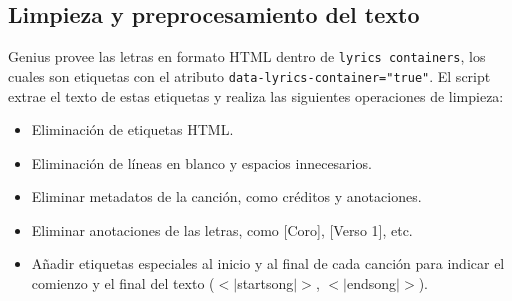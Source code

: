 \documentclass[paper=letter, fontsize=11pt, draft=false]{scrartcl}
\numberwithin{equation}{section} %
\numberwithin{figure}{section} %
\numberwithin{table}{section} %
\numberwithin{subsection}{section}
\begin{document}
\subsection{Limpieza y preprocesamiento del texto}

Genius provee las letras en formato HTML dentro de \texttt{lyrics containers}, los cuales son etiquetas con el atributo \texttt{data-lyrics-container="true"}. El script extrae el texto de estas etiquetas y realiza las siguientes operaciones de limpieza:

\begin{itemize}
    \item Eliminación de etiquetas HTML.
    \item Eliminación de líneas en blanco y espacios innecesarios.
    \item Eliminar metadatos de la canción, como créditos y anotaciones.
    \item Eliminar anotaciones de las letras, como [Coro], [Verso 1], etc.
    \item Añadir etiquetas especiales al inicio y al final de cada canción para indicar el comienzo y el final del texto ($<|$startsong$|>$, $<|$endsong$|>$).
\end{itemize}
\end{document}
